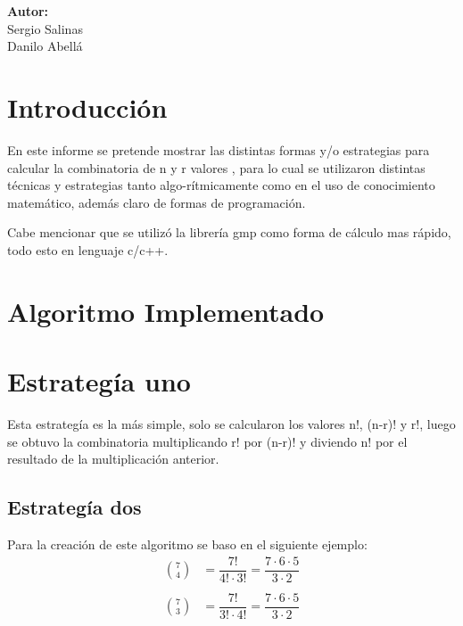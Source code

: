 \documentclass[12pt,letterpaper]{scrartcl}
\begin{document}
\begin{titlepage}
\begin{center}
\begin{minipage}[l]{0.4\textwidth}
	\begin{flushright}

		\textbf{\textsf{Autor:}}\\
		\linespread{1}
		\large Sergio Salinas\\
		\large Danilo Abellá\\

	\end{flushright}
\end{minipage}

\end{center}

\end{titlepage}

\section*{Introducción}

En este informe se pretende mostrar las distintas formas y/o estrategias para calcular la combinatoria de n y r valores , para lo cual se utilizaron distintas técnicas y estrategias tanto algo-rítmicamente como en el uso de conocimiento matemático, además claro de formas de programación.

Cabe mencionar que se utilizó la librería gmp como forma de cálculo mas rápido, todo esto en lenguaje c/c++.
\section{Algoritmo Implementado}

\section{Estrategía uno}

Esta estrategía es la más simple, solo se calcularon los valores n!, (n-r)! y r!, luego  se obtuvo la combinatoria multiplicando r! por (n-r)! y diviendo n! por el resultado de la multiplicación anterior.

\subsection{Estrategía dos}

Para la creación de este algoritmo se baso en el siguiente ejemplo:
\[\begin{matrix}
{7 \choose 4}  &= \dfrac{7!}{4! \cdot 3!} = \dfrac{7 \cdot 6 \cdot 5}{3 \cdot 2}\\ 
 &\\
{7 \choose 3}  &= \dfrac{7!}{3!\cdot4!} = \dfrac{7 \cdot 6 \cdot 5}{3 \cdot 2 }\\
\end{matrix}
\]
\end{document}
